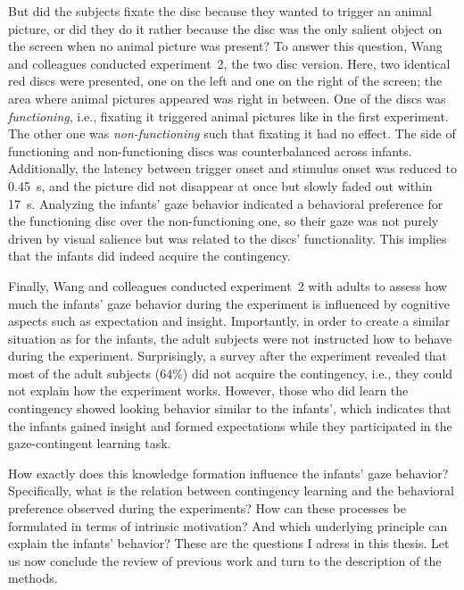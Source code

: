 \documentclass[a4paper]{scrreprt}
\begin{document}
But did the subjects fixate the disc because they wanted to trigger an animal picture, or did they do it rather because the disc was the only salient object on the screen when no animal picture was present? To answer this question, Wang and colleagues conducted experiment~2, the two disc version. Here, two identical red discs were presented, one on the left and one on the right of the screen; the area where animal pictures appeared was right in between. One of the discs was \textit{functioning}, i.e., fixating it triggered animal pictures like in the first experiment. The other one was \textit{non-functioning} such that fixating it had no effect. The side of functioning and non-functioning discs was counterbalanced across infants. Additionally, the latency between trigger onset and stimulus onset was reduced to 0.45~s, and the picture did not disappear at once but slowly faded out within 17~s.
Analyzing the infants' gaze behavior indicated a behavioral preference for the functioning disc over the non-functioning one, so their gaze was not purely driven by visual salience but was related to the discs' functionality. This implies that the infants did indeed acquire the contingency.

Finally, Wang and colleagues conducted experiment~2 with adults to assess how much the infants' gaze behavior during the experiment is influenced by cognitive aspects such as expectation and insight. Importantly, in order to create a similar situation as for the infants, the adult subjects were not instructed how to behave during the experiment. Surprisingly, a survey after the experiment revealed that most of the adult subjects (64\%) did not acquire the contingency, i.e., they could not explain how the experiment works. However, those who did learn the contingency showed looking behavior similar to the infants', which indicates that the infants gained insight and formed expectations while they participated in the gaze-contingent learning task.

How exactly does this knowledge formation influence the infants' gaze behavior? Specifically, what is the relation between contingency learning and the behavioral preference observed during the experiments? How can these processes be formulated in terms of intrinsic motivation? And which underlying principle can explain the infants' behavior? These are the questions I adress in this thesis. Let us now conclude the review of previous work and turn to the description of the methods.
\end{document}
